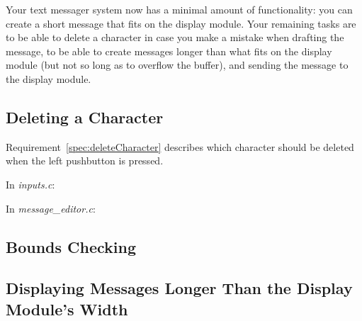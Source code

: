 Your text messager system now has a minimal amount of functionality: you can create a short message that fits on the display module.
Your remaining tasks are to be able to delete a character in case you make a mistake when drafting the message, to be able to create messages longer than what fits on the display module (but not so long as to overflow the buffer), and sending the message to the display module.

\subsection{Deleting a Character}

Requirement~\ref{spec:deleteCharacter} describes which character should be deleted when the left pushbutton is pressed.

In \textit{inputs.c}:
\begin{description}
\end{description}

In \textit{message\_editor.c}:
\begin{description}
\end{description}

\subsection{Bounds Checking}

\begin{description}
\end{description}

\subsection{Displaying Messages Longer Than the Display Module's Width}

